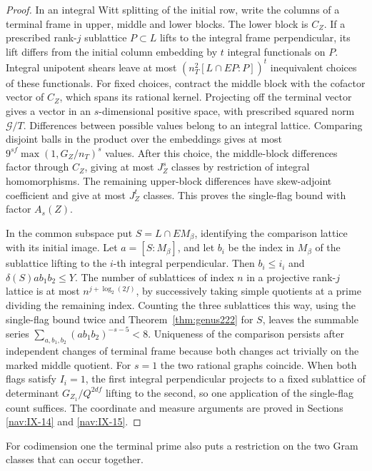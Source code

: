 \documentclass[a4paper,11pt]{article}
\theoremstyle{definition}
\theoremstyle{remark}
\numberwithin{equation}{section}
\begin{document}
\begin{proof}
In an integral Witt splitting of the initial row, write
the columns of a terminal frame in upper, middle and lower
blocks. The lower block is \(C_Z\). If a prescribed
rank-\(j\) sublattice \(P\subset L\) lifts to the integral
frame perpendicular, its lift differs from the initial
column embedding by \(t\) integral functionals on \(P\).
Integral unipotent shears leave at most
\((n_T^2[L\cap EP:P])^t\) inequivalent choices of these
functionals. For fixed choices, contract the middle block
with the cofactor vector of \(C_Z\), which spans its rational
kernel. Projecting off the terminal vector gives a vector
in an \(s\)-dimensional positive space, with prescribed
squared norm \(\mathcal G/T\). Differences between possible
values belong to an integral lattice. Comparing disjoint
balls in the product over the embeddings gives at most
\(9^{sf}\max(1,G_Z/n_T)^s\) values. After this choice, the
middle-block differences factor through \(C_Z\), giving at
most \(J_Z^s\) classes by restriction of integral
homomorphisms. The remaining upper-block differences have
skew-adjoint coefficient and give at most \(J_Z^t\) classes.
This proves the single-flag bound with factor \(A_s(Z)\).

In the common subspace put \(S=L\cap EM_\beta\), identifying
the comparison lattice with its initial image. Let
\(a=[S:M_\beta]\), and let \(b_i\) be the index in \(M_\beta\)
of the sublattice lifting to the \(i\)-th integral
perpendicular. Then \(b_i\le i_i\) and
\(\delta(S) a b_1 b_2\le Y\). The number of sublattices of
index \(n\) in a projective rank-\(j\) lattice is at most
\(n^{j+\log_2(2f)}\), by successively taking simple
quotients at a prime dividing the remaining index. Counting
the three sublattices this way, using the single-flag bound
twice and Theorem~\ref{thm:genus222} for \(S\), leaves the
summable series \(\sum_{a,b_1,b_2}(ab_1b_2)^{-s-5}<8\).
Uniqueness of the comparison persists after independent
changes of terminal frame because both changes act trivially
on the marked middle quotient. For \(s=1\) the two rational
graphs coincide. When both flags satisfy \(I_i=1\), the
first integral perpendicular projects to a fixed sublattice
of determinant \(G_{Z_1}/Q^{2df}\) lifting to the second,
so one application of the single-flag count suffices. The
coordinate and measure arguments are proved in
Sections \ref{nav:IX-14} and \ref{nav:IX-15}.
\end{proof}

For codimension one the terminal prime also puts a restriction on the two Gram classes that can occur together.
\end{document}
